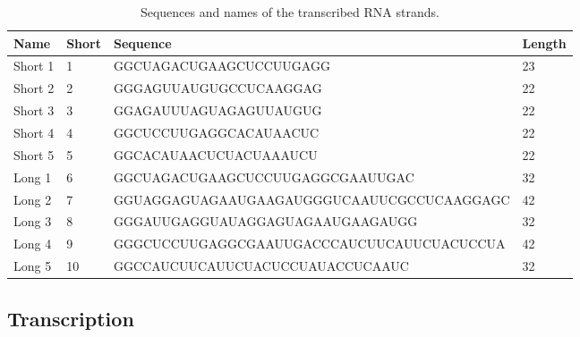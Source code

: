 \begin{table}
\begin{adjustbox}{width=\columnwidth}
\begin{tabular}{llll}
\hline
\textbf{Name}      & \textbf{Short} & \textbf{Sequence}                                           & \textbf{Length} \\
\hline
Short 1            & 1          & GGCUAGACUGAAGCUCCUUGAGG                    & 23     \\
Short 2            & 2          & GGGAGUUAUGUGCCUCAAGGAG                     & 22     \\
Short 3            & 3          & GGAGAUUUAGUAGAGUUAUGUG                     & 22     \\
Short 4            & 4          & GGCUCCUUGAGGCACAUAACUC                     & 22     \\
Short 5            & 5          & GGCACAUAACUCUACUAAAUCU                     & 22     \\
Long 1             & 6          & GGCUAGACUGAAGCUCCUUGAGGCGAAUUGAC           & 32     \\
Long 2             & 7          & GGUAGGAGUAGAAUGAAGAUGGGUCAAUUCGCCUCAAGGAGC & 42     \\
Long 3             & 8          & GGGAUUGAGGUAUAGGAGUAGAAUGAAGAUGG           & 32     \\
Long 4             & 9          & GGGCUCCUUGAGGCGAAUUGACCCAUCUUCAUUCUACUCCUA & 42     \\
Long 5             & 10         & GGCCAUCUUCAUUCUACUCCUAUACCUCAAUC           & 32     \\
\hline
\end{tabular}
\end{adjustbox}
\caption{Sequences and names of the transcribed RNA strands.}
\label{rna_strands}
\end{table}


\subsection{Transcription}


